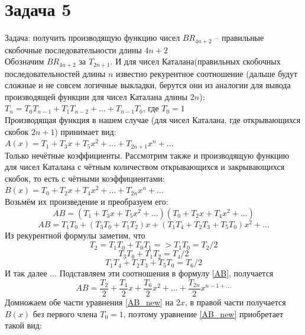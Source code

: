 \documentclass[a4paper,12pt]{article} %
\begin{document}
\begin{itemize}
\end{itemize}

\section*{Задача 5}
Задача: получить производящую функцию чисел $ BR_{4n+2} $ -- правильные скобочные последовательности длины $ 4n + 2 $\\
Обозначим $ BR_{4n+2} $ за $ T_{2n+1} $. И для чисел Каталана(правильных скобочных последовательностей длины $ n $ известно рекурентное соотношение (дальше будут сложные и не совсем логичные выкладки, берутся они из аналогии для вывода производящей функции для чисел Каталана длины $ 2n $):\\
$ T_{n}=T_{0} T_{n-1}+T_{1} T_{n-2}+\ldots+T_{n-1} T_{0} $, где 
$ T_0 = 1 $\\
Производящая функция в нашем случае (для чисел Каталана, где открывающихся скобок $ 2n+1 $) принимает вид: \\
$ A(x)=T_{1}+T_{3} x+T_{5} x^{2}+\ldots+T_{2 n+1} x^{n}+\ldots $\\
Только нечётные коэффициенты. Рассмотрим также и производящую функцию для чисел Каталана с чётным количеством открывающихся и закрывающихся скобок, то есть с чётными коэффициентами:\\
$ B(x)=T_{0}+T_{2} x+T_{4} x^{2}+\ldots+T_{2 n} x^{n}+\ldots $\\
Возьмём их произведение и преобразуем его:\\
 \[A B=\left(T_{1}+T_{3} x+T_{5} x^{2}+\ldots\right)\left(T_{0}+T_{2} x+T_{4} x^{2}+\ldots\right) \] 
\begin{equation}\label{AB}
 A B=T_{1} T_{0}+\left(T_{3} T_{0}+T_{1} T_{2}\right) x+\left(T_{1} T_{4}+T_{2} T_{3}+T_{5} T_{0}\right) x^{2}+\ldots
\end{equation} 
Из рекурентной формулы заметим, что \\
\[ T_{2}=T_{1} T_{0}+T_{0} T_{1}=>T_{1} T_{0}=T_{2} / 2\]
\[ T_{3} T_{0}+T_{1} T_{2}=T_{4} / 2 \]
\[ T_{1} T_{4}+T_{2} T_{3}+T_{5} T_{0}=T_{6} / 2\] 
И так далее $ \ldots $ Подставляем эти соотношения в формулу \eqref{AB}, получается\\
\begin{equation}\label{AB_new}
 A B=\frac{T_{2}}{2}+\frac{T_{4}}{2} x+\frac{T_{6}}{2} x^{2}+\ldots+\frac{T_{2 n}}{2} x^{n-1+\ldots}
\end{equation} 
Домножаем обе части уравнения \eqref{AB_new} на $ 2x $, в правой части получается $ B(x) $ без первого члена $ T_0 = 1 $, поэтому уравнение \eqref{AB_new} приобретает такой вид:\\
\end{document}
